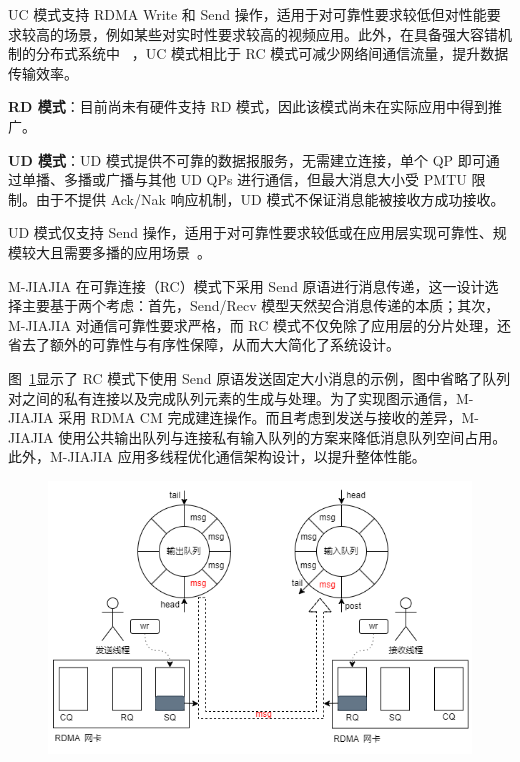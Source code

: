 {UC 模式支持 RDMA Write 和 Send 操作，适用于对可靠性要求较低但对性能要求较高的场景，例如某些对实时性要求较高的视频应用。此外，在具备强大容错机制的分布式系统中 ~\citep{kalia2014herd}，UC 模式相比于 RC 模式可减少网络间通信流量，提升数据传输效率。

\textbf{RD 模式}：目前尚未有硬件支持 RD 模式，因此该模式尚未在实际应用中得到推广。

\textbf{UD 模式}：UD 模式提供不可靠的数据报服务，无需建立连接，单个 QP 即可通过单播、多播或广播与其他 UD QPs 进行通信，但最大消息大小受 PMTU 限制。由于不提供 Ack/Nak 响应机制，UD 模式不保证消息能被接收方成功接收。

UD 模式仅支持 Send 操作，适用于对可靠性要求较低或在应用层实现可靠性、规模较大且需要多播的应用场景~\citep{kalia2014herd,kalia2016fasst}。

M-JIAJIA 在可靠连接（RC）模式下采用 Send 原语进行消息传递，这一设计选择主要基于两个考虑：首先，Send/Recv 模型天然契合消息传递的本质；其次，M-JIAJIA 对通信可靠性要求严格，而 RC 模式不仅免除了应用层的分片处理，还省去了额外的可靠性与有序性保障，从而大大简化了系统设计。

图~\ref{fig:mjiajia-send-recv}显示了 RC 模式下使用 Send 原语发送固定大小消息的示例，图中省略了队列对之间的私有连接以及完成队列元素的生成与处理。为了实现图示通信，M-JIAJIA 采用 RDMA CM 完成建连操作。而且考虑到发送与接收的差异，M-JIAJIA 使用公共输出队列与连接私有输入队列的方案来降低消息队列空间占用。此外，M-JIAJIA 应用多线程优化通信架构设计，以提升整体性能。
\begin{figure}[H]
    \centering
    \includegraphics[width=\textwidth]{Img/RDMA-send-receive.png}
    \label{fig:mjiajia-send-recv}
\end{figure}



}
